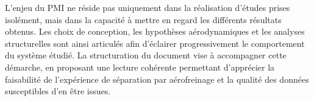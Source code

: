 L’enjeu du PMI ne réside pas uniquement dans la réalisation d’études prises isolément, mais dans la capacité à mettre en regard
les différents résultats obtenus. Les choix de conception, les hypothèses aérodynamiques et les analyses structurelles sont
ainsi articulés afin d’éclairer progressivement le comportement du système étudié. La structuration du document vise à
accompagner cette démarche, en proposant une lecture cohérente permettant d’apprécier la faisabilité de l’expérience de
séparation par aérofreinage et la qualité des données susceptibles d’en être issues.

\newpage